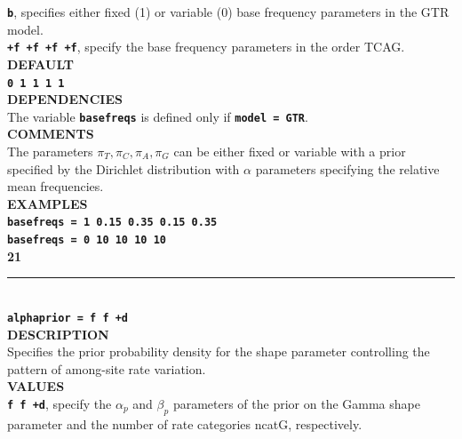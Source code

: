 \documentclass{book}
\numberwithin{equation}{section} \renewcommand{\baselinestretch}{0.55}
\begin{document}
\textbf{\texttt{b}}, specifies either fixed (1) or variable (0) base frequency parameters in the GTR model. \vspace{5pt}\\
\textbf{\texttt{+f +f +f +f}}, specify the base frequency parameters in the order TCAG. \vspace{5pt}\\
\textbf{DEFAULT} \vspace{5pt}\\
\textbf{\texttt{0 1 1 1 1}} \vspace{5pt}\\
\textbf{DEPENDENCIES} \vspace{5pt}\\
The variable \textbf{\texttt{basefreqs}} is defined only if
\textbf{\texttt{model = GTR}}.
\vspace{5pt}\\
\textbf{COMMENTS} \vspace{5pt}\\
The parameters $\pi_T, \pi_C, \pi_A, \pi_G$ can be either fixed or
variable with a prior specified by the Dirichlet distribution
with $\alpha$ parameters specifying the relative mean frequencies. \vspace{5pt}\\
\textbf{EXAMPLES} \vspace{5pt}\\
\textbf{\texttt{basefreqs = 1 0.15 0.35 0.15 0.35 }} \vspace{5pt}\\
\textbf{\texttt{basefreqs = 0  10  10 10  10 }}\vspace{10pt}\\
\textbf{{\large 21}} \\
\noindent\rule{\textwidth}{0.8pt} \\
\textbf{{\Large \texttt{alphaprior = f f +d }}} \vspace{5pt}\\
\textbf{DESCRIPTION} \vspace{5pt}\\
Specifies the prior probability density for the shape parameter
controlling the pattern of among-site rate variation.
\vspace{5pt}\\
\textbf{VALUES} \vspace{5pt}\\
\textbf{\texttt{f f +d}}, specify the $\alpha_p$ and $\beta_p$
parameters of the prior on the Gamma shape parameter and the number of
rate
categories ncatG, respectively. \vspace{5pt}\\
\end{document}

